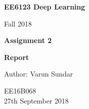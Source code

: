 \begin{titlepage}
    \begin{center}
        \vspace*{1cm}
        
        \Huge
          \textbf{EE6123 Deep Learning}
        
        \vspace{0.5cm}
        \LARGE
        Fall 2018
        
        \vspace{1.5cm}
        
        \textbf{Assignment 2}
   		  \vspace{1.5cm}
        
        \textbf{Report}
       
        \vfill
        
        Author: Varun Sundar
        
        \vspace{0.8cm}
          \Large
        EE16B068 \\
        \vspace{0.5cm}
       27th September 2018
        
    \end{center}
\end{titlepage}
